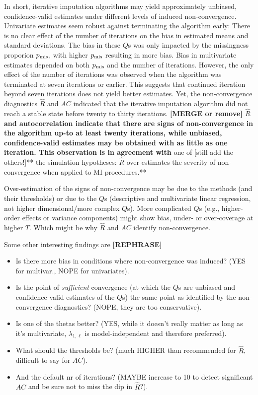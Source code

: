 \documentclass[Royal,times,sageh]{sagej}
\begin{document}
In short, iterative imputation algorithms may yield approximately unbiased, confidence-valid estimates under different levels of induced non-convergence. Univariate estimates seem robust against terminating the algorithm early: There is no clear effect of the number of iterations on the bias in estimated means and standard deviations. The bias in these \(Q\)s was only impacted by the missingness proporion \(p_{\rm mis}\), with higher \(p_{\rm mis}\) resulting in more bias. Bias in multivariate estimates depended on both \(p_{\rm mis}\) and the number of iterations. However, the only effect of the number of iterations was observed when the algorithm was terminated at seven iterations or earlier. This suggests that continued iteration beyond seven iterations does not yield better estimates. Yet, the non-convergence diagnostics \(\widehat{R}\) and \(AC\) indicated that the iterative imputation algorithm did not reach a stable state before twenty to thirty iterations. \textbf{{[}MERGE or remove{]} \(\widehat{R}\) and autocorrelation indicate that there are signs of non-convergence in the algorithm up-to at least twenty iterations, while unbiased, confidence-valid estimates may be obtained with as little as one iteration. This observation is in agreement with }one of {[}still add the others!{]}** the simulation hypotheses: \(\widehat{R}\) over-estimates the severity of non-convergence when applied to MI procedures.**

Over-estimation of the signs of non-convergence may be due to the methods (and their thresholds) or due to the \(Q\)s (descriptive and multivariate linear regression, not higher dimensional/more complex \(Q\)s). More complicated \(Q\)s (e.g., higher-order effects or variance components) might show bias, under- or over-coverage at higher \(T\). Which might be why \(\widehat{R}\) and \(AC\) identify non-convergence.

Some other interesting findings are \textbf{{[}REPHRASE{]}}

\begin{itemize}
\item
  Is there more bias in conditions where non-convergence was induced? (YES for multivar., NOPE for univariates).
\item
  Is the point of \emph{sufficient} convergence (at which the \(\bar{Q}\)s are unbiased and confidence-valid estimates of the \(Q\)s) the same point as identified by the non-convergence diagnostics? (NOPE, they are too conservative).
\item
  Is one of the thetas better? (YES, while it doesn't really matter as long as it's multivariate, \(\lambda_{1, \ell}\) is model-independent and therefore preferred).
\item
  What should the thresholds be? (much HIGHER than recommended for \(\widehat{R}\), difficult to say for \(AC\)).
\item
  And the default nr of iterations? (MAYBE increase to 10 to detect significant \(AC\) and be sure not to miss the dip in \(\widehat{R}\)?).
\end{itemize}
\end{document}
